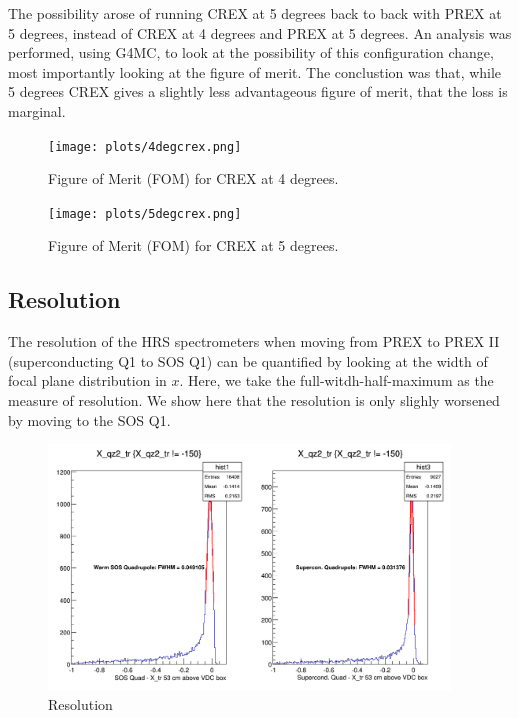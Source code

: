 \documentclass[11pt]{amsart}
\begin{document}
\FloatBarrier

The possibility arose of running CREX at 5 degrees back to back with PREX at 5 degrees, instead of CREX at 4 degrees and PREX at 5 degrees. An analysis was performed, using G4MC, to look at the possibility of this configuration change, most importantly looking at the figure of merit. The conclustion was that, while 5 degrees CREX gives a slightly less advantageous figure of merit, that the loss is marginal.

\FloatBarrier

\begin{figure}
\texttt{[image: plots/4degcrex.png]}
\caption{Figure of Merit (FOM) for CREX at 4 degrees.}
\end{figure}

\begin{figure}
\texttt{[image: plots/5degcrex.png]}
\caption{Figure of Merit (FOM) for CREX at 5 degrees.}
\end{figure}

\FloatBarrier

\subsection{ Resolution }

The resolution of the HRS spectrometers when moving from PREX to PREX II (superconducting Q1 to SOS Q1) can be quantified by looking at the width of focal plane distribution in  $x$. Here, we take the full-witdh-half-maximum as the measure of resolution. We show here that the resolution is only slighly worsened by moving to the SOS Q1.

\FloatBarrier
\begin{figure}
\includegraphics[width=0.95\textwidth]{plots/res.png}
\caption{Resolution}
\end{figure}
\FloatBarrier
\end{document}
